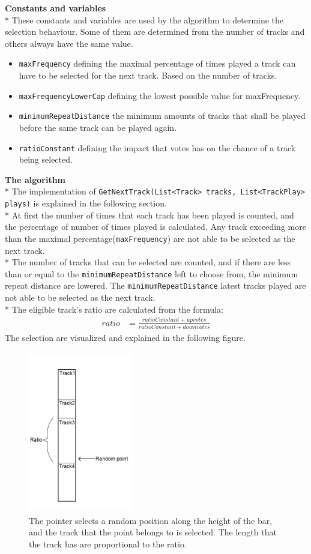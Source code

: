 \documentclass[a4paper,11pt,report]{article}
\begin{document}
\textbf{Constants and variables} \\*
These constants and variables are used by the algorithm to determine the selection behaviour. Some of them are determined from the number of tracks and others always have the same value.
\begin{itemize}
\item \texttt{maxFrequency} defining the maximal percentage of times played a track can have to be selected for the next track. Based on the number of tracks.
\item \texttt{maxFrequencyLowerCap} defining the lowest possible value for maxFrequency.
\item \texttt{minimumRepeatDistance} the minimum amounts of tracks that shall be played before the same track can be played again.
\item \texttt{ratioConstant} defining the impact that votes has on the chance of a track being selected.
\end{itemize}
\textbf{The algorithm} \\*
The implementation of \texttt{GetNextTrack(List<Track> tracks, List<TrackPlay> plays)} is explained in the following section. \\*
At first the number of times that each track has been played is counted, and the percentage of number of times played is calculated. Any track exceeding more than the maximal percentage(\texttt{maxFrequency}) are not able to be selected as the next track. \\*
The number of tracks that can be selected are counted, and if there are less than or equal to the \texttt{minimumRepeatDistance} left to choose from, the minimum repeat distance are lowered. The \texttt{minimumRepeatDistance} latest tracks played are not able to be selected as the next track.  \\*
The eligible track's ratio are calculated from the formula:
\begin{align*}
ratio &= \frac{ratioConstant + upvotes}{ratioConstant + downvotes}
\end{align*}
The selection are visualized and explained in the following figure.\\
\begin{figure}[htp]
\centering
\includegraphics[width=130pt,height=200pt,keepaspectratio=true]{./trackSelectionB.png}
\caption{The pointer selects a random position along the height of the bar, and the track that the point belongs to is selected. The length that the track has are proportional to the ratio.}
\end{figure}
\end{document}
